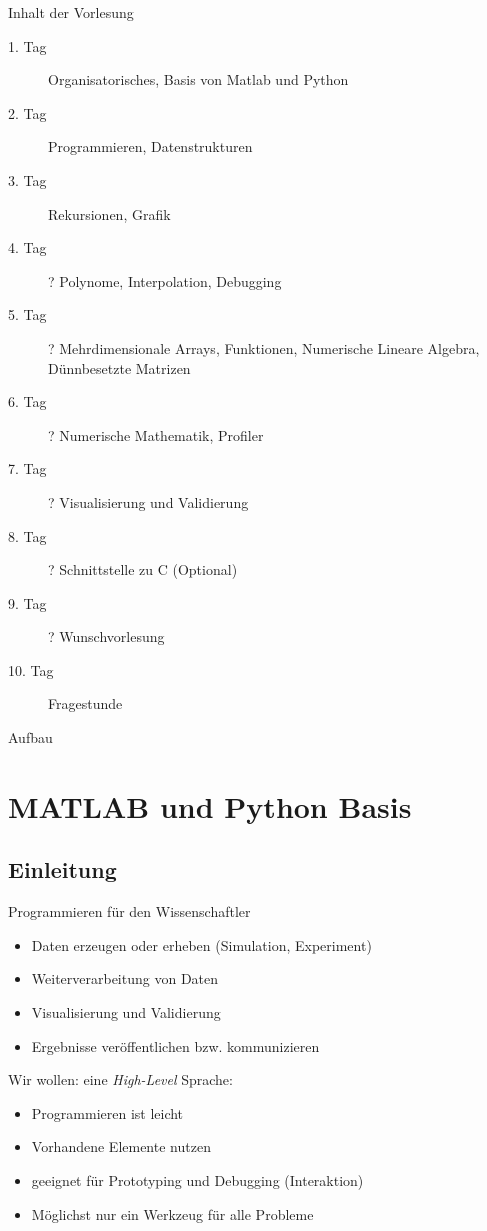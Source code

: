 \documentclass[hyperref={xetex}]{beamer}
\begin{document}
\begin{frame}{Inhalt der Vorlesung}
\begin{description}
\item[1. Tag] Organisatorisches, Basis von Matlab und Python
\item [2. Tag] Programmieren, Datenstrukturen
\item [3. Tag] Rekursionen, Grafik
\item [4. Tag] ? Polynome, Interpolation, Debugging
\item [5. Tag] ? Mehrdimensionale Arrays, Funktionen, Numerische Lineare Algebra, Dünnbesetzte Matrizen
\item [6. Tag] ? Numerische Mathematik, Profiler
\item [7. Tag] ? Visualisierung und Validierung
\item [8. Tag] ? Schnittstelle zu C (Optional)
\item [9. Tag] ? Wunschvorlesung
\item [10. Tag] Fragestunde
\end{description}
\end{frame}

\begin{frame}{Aufbau}
\tableofcontents
\end{frame}

\section{MATLAB und Python Basis}

\subsection{Einleitung}

\begin{frame}{Programmieren für den Wissenschaftler}
  \begin{itemize}
    \item Daten erzeugen oder erheben (Simulation, Experiment)
    \item Weiterverarbeitung von Daten
    \item Visualisierung und Validierung
    \item Ergebnisse veröffentlichen bzw. kommunizieren
  \end{itemize}

  \begin{block}{}
Wir wollen: eine \emph{High-Level} Sprache:
\begin{itemize}
\item Programmieren ist leicht
\item Vorhandene Elemente nutzen
\item geeignet für Prototyping und Debugging (Interaktion)
\item Möglichst nur ein Werkzeug für alle Probleme
\end{itemize}
\end{block}

\end{frame}
\end{document}
